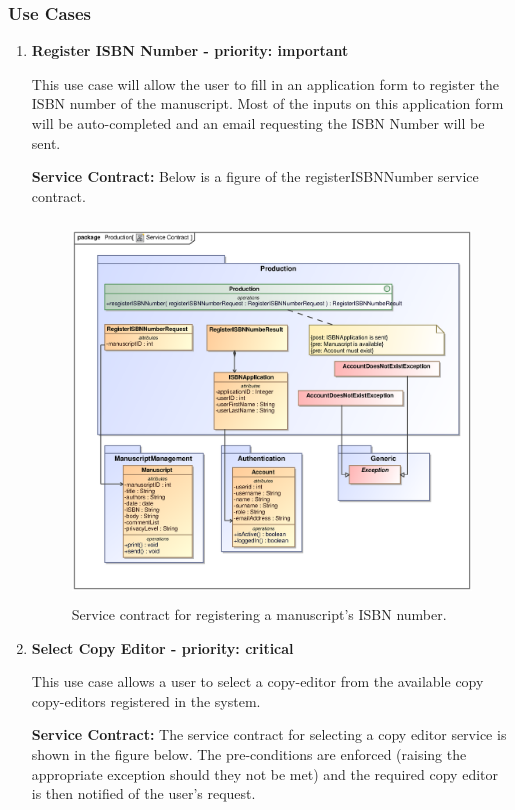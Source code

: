 \subsubsection{Use Cases}
\begin{enumerate}
\item \textbf{Register ISBN Number - priority: important}

\par{This use case will allow the user to fill in an application form to register the ISBN number of the manuscript. Most of the inputs on this application form will be auto-completed and an email requesting the ISBN Number will be sent.}

\textbf{Service Contract:} 
Below is a figure of the registerISBNNumber service contract.

\begin{figure}[h]
\includegraphics[height=380px, width=500px]{epsImages/Production/RegisterISBNNumber.eps}
\caption{Service contract for registering a manuscript's ISBN number.}
\end{figure}

\newpage
\item \textbf{Select Copy Editor - priority: critical}\\

\par{This use case allows a user to select a copy-editor from the available copy copy-editors registered in the system.}

\clearpage
\textbf{Service Contract:} 
The service contract for selecting a copy editor service is shown in the figure below. The pre-conditions are enforced (raising the appropriate exception should they not be met) and the required copy editor is then notified of the user's request.


\end{enumerate}
